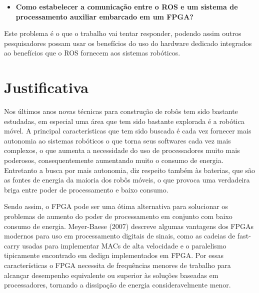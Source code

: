 \begin{itemize}
    \item \textbf{Como estabelecer a comunicação entre o ROS e um sistema de processamento auxiliar 
embarcado em um FPGA?}

\end{itemize}

Este problema é o que o trabalho vai tentar responder, podendo assim outros pesquisadores possam usar 
os benefícios do uso do hardware dedicado integrados ao benefícios que o ROS fornecem aos sistemas 
robóticos.






  


\section{Justificativa}

Nos últimos anos novas técnicas para construção de robôs tem sido bastante estudadas, em especial uma área que tem sido bastante explorada é a robótica móvel. A principal características que tem sido buscada é cada vez fornecer mais autonomia ao sistemas robóticos o que torna seus softwares cada vez mais complexos, o que aumenta a necessidade do uso de processadores muito mais poderosos, consequentemente aumentando muito o consumo de energia. Entretanto a busca por mais autonomia, diz respeito também às baterias, que são as fontes de energia da maioria dos robôs móveis, o que provoca uma verdadeira briga entre poder de processamento e baixo consumo.

Sendo assim, o FPGA pode ser uma ótima alternativa para solucionar os problemas de aumento do poder de processamento em conjunto com baixo consumo de energia. Meyer-Baese (2007) descreve algumas vantagens dos FPGAs modernos para uso em processamento digitais de sinais, como as cadeias de fast-carry usadas para implementar MACs de alta velocidade e o paralelismo tipicamente encontrado em dedign implementados em FPGA. Por essas características o FPGA necessita de frequências menores de trabalho para alcançar desempenho equivalente ou superior às soluções baseadas em processadores, tornando a dissipação de energia consideravelmente menor.

